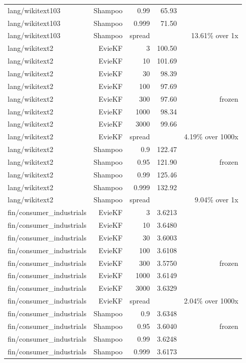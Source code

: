 \begin{table}[t]
\begin{tabular}{lrrrr}
lang/wikitext103 & Shampoo & 0.99 & 65.93 &  \\
lang/wikitext103 & Shampoo & 0.999 & 71.50 &  \\
lang/wikitext103 & Shampoo & spread &  & 13.61\% over 1x \\
lang/wikitext2 & EvieKF & 3 & 100.50 &  \\
lang/wikitext2 & EvieKF & 10 & 101.69 &  \\
lang/wikitext2 & EvieKF & 30 & 98.39 &  \\
lang/wikitext2 & EvieKF & 100 & 97.69 &  \\
lang/wikitext2 & EvieKF & 300 & 97.60 & frozen \\
lang/wikitext2 & EvieKF & 1000 & 98.34 &  \\
lang/wikitext2 & EvieKF & 3000 & 99.66 &  \\
lang/wikitext2 & EvieKF & spread &  & 4.19\% over 1000x \\
lang/wikitext2 & Shampoo & 0.9 & 122.47 &  \\
lang/wikitext2 & Shampoo & 0.95 & 121.90 & frozen \\
lang/wikitext2 & Shampoo & 0.99 & 125.46 &  \\
lang/wikitext2 & Shampoo & 0.999 & 132.92 &  \\
lang/wikitext2 & Shampoo & spread &  & 9.04\% over 1x \\
fin/consumer\_industrials & EvieKF & 3 & 3.6213 &  \\
fin/consumer\_industrials & EvieKF & 10 & 3.6480 &  \\
fin/consumer\_industrials & EvieKF & 30 & 3.6003 &  \\
fin/consumer\_industrials & EvieKF & 100 & 3.6108 &  \\
fin/consumer\_industrials & EvieKF & 300 & 3.5750 & frozen \\
fin/consumer\_industrials & EvieKF & 1000 & 3.6149 &  \\
fin/consumer\_industrials & EvieKF & 3000 & 3.6329 &  \\
fin/consumer\_industrials & EvieKF & spread &  & 2.04\% over 1000x \\
fin/consumer\_industrials & Shampoo & 0.9 & 3.6348 &  \\
fin/consumer\_industrials & Shampoo & 0.95 & 3.6040 & frozen \\
fin/consumer\_industrials & Shampoo & 0.99 & 3.6248 &  \\
fin/consumer\_industrials & Shampoo & 0.999 & 3.6173 &  \\

\end{tabular}
\end{table}
